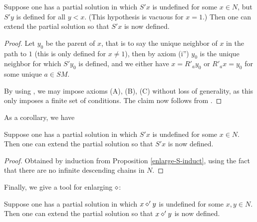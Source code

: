 \begin{proposition}\label{enlarge-S-induct}\leanok  Suppose one has a partial solution in which $S'x$ is undefined for some $x \in N$, but $S'y$ is defined for all $y < x$.  (This hypothesis is vacuous for $x=1$.) Then one can extend the partial solution so that $S'x$ is now defined.
\end{proposition}

\begin{proof}
    Let $y_0$ be the parent of $x$, that is to say the unique neighbor of $x$ in the path to $1$ (this is only defined for $x \neq 1$), then by axiom (i'') $y_0$ is the unique neighbor for which $S'y_0$ is defined, and we either have $x = R'_a y_0$ or $R'_a x = y_0$ for some unique $a \in SM$.

  By using , we may impose axioms (A), (B), (C) without loss of generality, as this only imposes a finite set of conditions.  The claim now follows from .
\end{proof}


As a corollary, we have

\begin{proposition}[Enlarging $S'$]\label{enlarge-S}\leanok  Suppose one has a partial solution in which $S'x$ is undefined for some $x \in N$.  Then one can extend the partial solution so that $S'x$ is now defined.
\end{proposition}

\begin{proof}  Obtained by induction from Proposition \ref{enlarge-S-induct}, using the fact that there are no infinite descending chains in $N$.
\end{proof}

Finally, we give a tool for enlarging $\op$:

\begin{proposition}[Enlarging $\op$]\label{enlarge-op}\leanok  Suppose one has a partial solution in which $x \diamond' y$ is undefined for some $x,y \in N$.  Then one can extend the partial solution so that $x \diamond' y$ is now defined.
\end{proposition}

